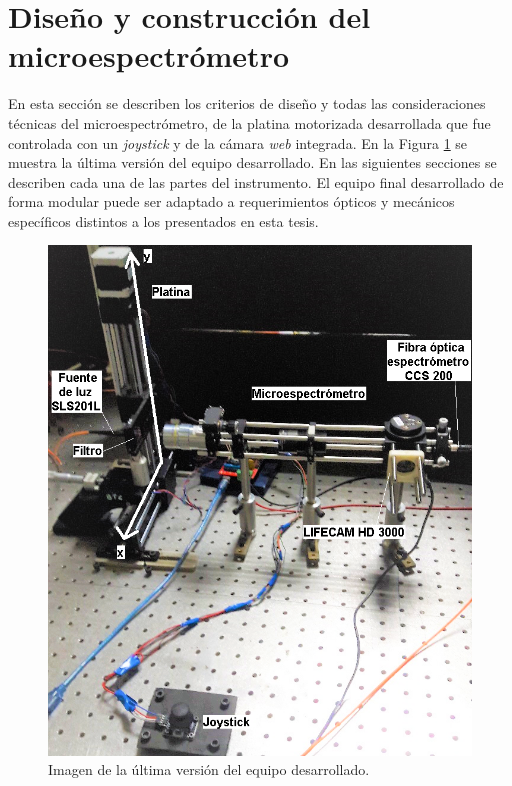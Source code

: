 \singlespacing
\section{Diseño y construcción del microespectrómetro}
\label{sec:montcontmsp}

\hspace{0.5cm}En esta sección se describen los criterios de diseño y todas las consideraciones técnicas del microespectrómetro, de la platina motorizada desarrollada que fue controlada con un \textit{joystick} y de la cámara \textit{web} integrada. En la Figura \ref{fig:presequipo} se muestra la última versión del equipo desarrollado. En las siguientes secciones se describen cada una de las partes del instrumento. El equipo final desarrollado de forma modular puede ser adaptado a requerimientos ópticos y mecánicos específicos distintos a los presentados en esta tesis.
\begin{figure}[H]
	\centering
	\includegraphics[scale=0.95]{Figs/microespectrometro/presentacion_equipo.png}
	\caption{Imagen de la última versión del equipo desarrollado.}
	\label{fig:presequipo}
\end{figure}



